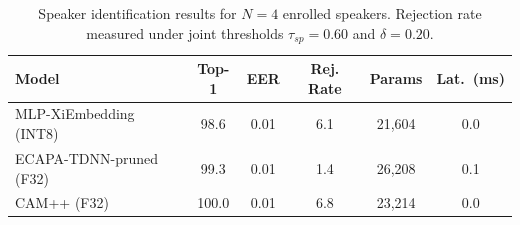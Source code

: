 \begin{table}[t]
\centering
\caption{Speaker identification results for $N=4$ enrolled speakers. Rejection rate measured under joint thresholds $\tau_{sp}=0.60$ and $\delta=0.20$.}
\label{tab:speaker_results}
\begin{tabular}{lccccc}
\toprule
Model & Top-1 & EER & Rej. Rate & Params & Lat.\ (ms) \\
\midrule
MLP-XiEmbedding (INT8) & 98.6 & 0.01 & 6.1 & 21,604 & 0.0 \\
ECAPA-TDNN-pruned (F32) & 99.3 & 0.01 & 1.4 & 26,208 & 0.1 \\
CAM++ (F32) & 100.0 & 0.01 & 6.8 & 23,214 & 0.0 \\
\bottomrule
\end{tabular}
\end{table}
